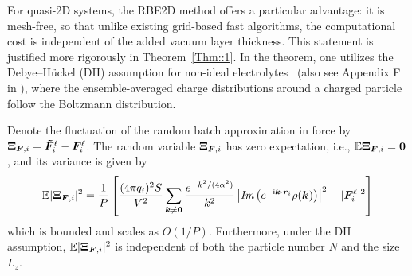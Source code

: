 For quasi-2D systems, the RBE2D method offers a particular advantage: it is mesh-free, so that unlike existing grid-based fast algorithms, the computational cost is independent   {of the} added vacuum layer thickness. This statement is justified more rigorously in Theorem~\ref{Thm::1}. 
 {In the theorem, one utilizes the Debye--H\"uckel (DH) assumption for non-ideal electrolytes~\cite{levin2002electrostatic} (also see Appendix F in \cite{gan2024fast}), where the ensemble-averaged charge distributions around a charged particle follow the Boltzmann distribution.
}

\begin{thm}\label{Thm::1} 
    Denote the fluctuation of the random batch approximation in force by $\boldsymbol{\Xi}_{\boldsymbol{F},i}=\boldsymbol{\tilde{F}}_i^{\ell}-\boldsymbol{F}_i^{\ell}$. The random variable $\boldsymbol{\Xi}_{\boldsymbol{F},i}$ has zero expectation, i.e., $\mathbb{E}\boldsymbol{\Xi}_{\boldsymbol{F},i}=\boldsymbol{0}$, and its variance is given by
    \begin{equation}\label{eq::30}
        \mathbb{E}|\boldsymbol{\Xi}_{\boldsymbol{F},i}|^2=\frac{1}{P}\left[\frac{(4\pi q_i)^2S}{V^2}\sum_{\bm{k}\neq \bm{0}}\frac{e^{-k^2/(4\alpha^2)}}{k^2}\left|\emph{Im}\left(e^{-\mathsf i \boldsymbol{k} \cdot \boldsymbol{r}_i}\rho(\boldsymbol{k})\right)\right|^2-|\boldsymbol{F}_{i}^{\ell}|^2\right]
    \end{equation}
    which is bounded and scales as $O(1/P)$. Furthermore, under the DH assumption, $\mathbb{E}|\boldsymbol{\Xi}_{\boldsymbol{F},i}|^2$ is independent of both the particle number $N$ and the size $L_z$.
\end{thm}

